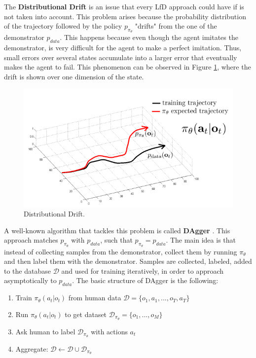 The \textbf{Distributional Drift} is an issue that every LfD approach could have if is not taken into account. This problem arises because the probability distribution of the trajectory followed by the policy $p_{\pi_{\theta}}$ "drifts" from the one of the demonstrator $p_{data}$. This happens because even though the agent imitates the demonstrator, is very difficult for the agent to make a perfect imitation. Thus, small errors over several states accumulate into a larger error that eventually makes the agent to fail. This phenomenon can be observed in Figure \ref{fig:drift}, where the drift is shown over one dimension of the state.

\begin{figure}[H]
    \centering
    \includegraphics[width=0.7\linewidth]{imagenes/cap1/drift.png}
    \caption{Distributional Drift.}
    \label{fig:drift}
\end{figure}

A well-known algorithm that tackles this problem is called \textbf{DAgger} \cite{ross2011reduction}. This approach matches $p_{\pi_{\theta}}$ with $p_{data}$, such that $p_{\pi_{\theta}} = p_{data}$. The main idea is that instead of collecting samples from the demonstrator, collect them by running $\pi_{\theta}$ and then label them with the demonstrator. Samples are collected, labeled, added to the database $\mathcal{D}$ and used for training iteratively, in order to approach asymptotically to $p_{data}$. The basic structure of DAgger is the following:

\begin{enumerate}
    \item Train $\pi_{\theta}(a_{t}|o_{t})$ from human data $\mathcal{D}=\{o_{1},a_{1},...,o_{T},a_{T}\}$
    \item Run $\pi_{\theta}(a_{t}|o_{t})$ to get dataset $\mathcal{D}_{\pi_{\theta}}=\{o_{1},...,o_{M}\}$
    \item Ask human to label $\mathcal{D}_{\pi_{\theta}}$ with actions $a_{t}$
    \item Aggregate: $\mathcal{D} \leftarrow \mathcal{D} \cup \mathcal{D_{\pi_{\theta}}}$
\end{enumerate}

